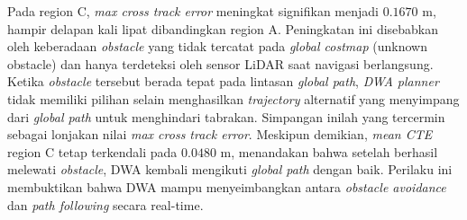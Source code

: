 Pada region C, \emph{max cross track error} meningkat signifikan menjadi
$0.1670$ m, hampir delapan kali lipat dibandingkan region A. Peningkatan ini
disebabkan oleh keberadaan \emph{obstacle} yang tidak tercatat pada
\emph{global costmap} (unknown obstacle) dan hanya terdeteksi oleh sensor
LiDAR saat navigasi berlangsung. Ketika \emph{obstacle} tersebut berada tepat
pada lintasan \emph{global path}, \emph{DWA planner} tidak memiliki pilihan
selain menghasilkan \emph{trajectory} alternatif yang menyimpang dari
\emph{global path} untuk menghindari tabrakan. Simpangan inilah yang tercermin
sebagai lonjakan nilai \emph{max cross track error}. Meskipun demikian,
\emph{mean CTE} region C tetap terkendali pada $0.0480$ m, menandakan bahwa
setelah berhasil melewati \emph{obstacle}, DWA kembali mengikuti \emph{global
path} dengan baik. Perilaku ini membuktikan bahwa DWA mampu menyeimbangkan
antara \emph{obstacle avoidance} dan \emph{path following} secara real-time.

